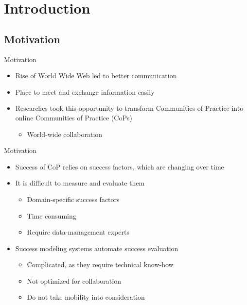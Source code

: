 \section{Introduction}

\subsection{Motivation}


\begin{frame}{Motivation}
  \begin{itemize}
    \item Rise of World Wide Web led to better communication
    \item Place to meet and exchange information easily
    \item Researches took this opportunity to transform Communities of Practice into online Communities of Practice (CoPs)
          \begin{itemize}
            \item World-wide collaboration
          \end{itemize}
  \end{itemize}

\end{frame}

\begin{frame}{Motivation}
  \begin{itemize}
    \item Success of CoP relies on success factors, which are changing over time
    \item It is difficult to measure and evaluate them
          \begin{itemize}
            \item Domain-specific success factors
            \item Time consuming
            \item Require data-management experts %
          \end{itemize}
    \item Success modeling systems automate success evaluation
          \begin{itemize}
            \item Complicated, as they require technical know-how
            \item Not optimized for collaboration
            \item Do not take mobility into consideration
          \end{itemize}
  \end{itemize}
\end{frame}

